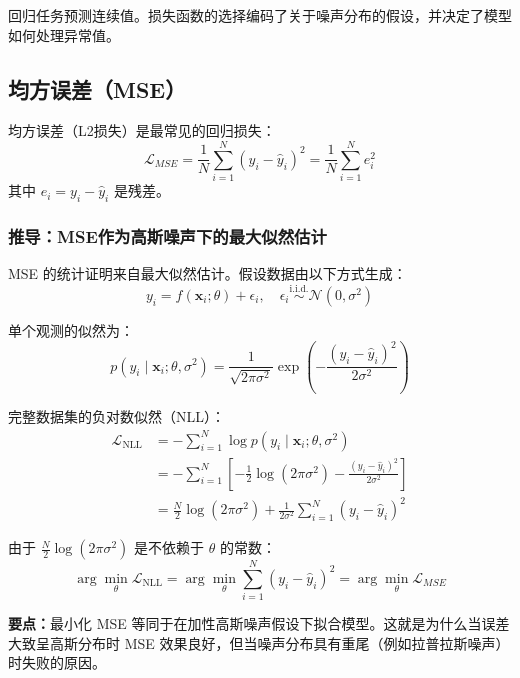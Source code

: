 回归任务预测连续值。损失函数的选择编码了关于噪声分布的假设，并决定了模型如何处理异常值。

\subsection{均方误差（MSE）}

均方误差（L2损失）是最常见的回归损失：
\begin{equation}
\mathcal{L}_{MSE} = \frac{1}{N}\sum_{i=1}^{N} (y_i - \hat{y}_i)^2 = \frac{1}{N}\sum_{i=1}^{N} e_i^2
\end{equation}
其中 $e_i = y_i - \hat{y}_i$ 是残差。

\subsubsection{推导：MSE作为高斯噪声下的最大似然估计}

MSE 的统计证明来自最大似然估计。假设数据由以下方式生成：
\begin{equation}
y_i = f(\mathbf{x}_i; \theta) + \epsilon_i, \quad \epsilon_i \overset{\text{i.i.d.}}{\sim} \mathcal{N}(0, \sigma^2)
\end{equation}

单个观测的似然为：
\begin{equation}
p(y_i \mid \mathbf{x}_i; \theta, \sigma^2) = \frac{1}{\sqrt{2\pi\sigma^2}} \exp\left(-\frac{(y_i - \hat{y}_i)^2}{2\sigma^2}\right)
\end{equation}

完整数据集的负对数似然（NLL）：
\begin{align}
\mathcal{L}_{\text{NLL}} &= -\sum_{i=1}^{N} \log p(y_i \mid \mathbf{x}_i; \theta, \sigma^2) \\
&= -\sum_{i=1}^{N}\left[-\frac{1}{2}\log(2\pi\sigma^2) - \frac{(y_i - \hat{y}_i)^2}{2\sigma^2}\right] \\
&= \frac{N}{2}\log(2\pi\sigma^2) + \frac{1}{2\sigma^2}\sum_{i=1}^{N}(y_i - \hat{y}_i)^2
\end{align}

由于 $\frac{N}{2}\log(2\pi\sigma^2)$ 是不依赖于 $\theta$ 的常数：
\begin{equation}
\boxed{\arg\min_\theta \mathcal{L}_{\text{NLL}} = \arg\min_\theta \sum_{i=1}^{N}(y_i - \hat{y}_i)^2 = \arg\min_\theta \mathcal{L}_{MSE}}
\end{equation}

\textbf{要点：}最小化 MSE 等同于在加性高斯噪声假设下拟合模型。这就是为什么当误差大致呈高斯分布时 MSE 效果良好，但当噪声分布具有重尾（例如拉普拉斯噪声）时失败的原因。

